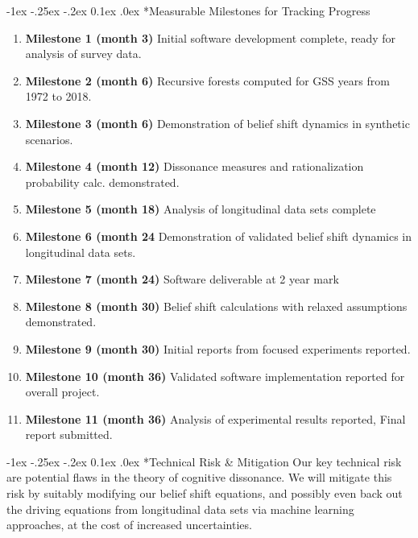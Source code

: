 \documentclass[onecolumn, compsoc,11pt]{IEEEtran}
\makeatletter
\renewcommand\subsection{\@startsection {section}{1}{\z@}%
                                   {-1ex \@plus -.25ex \@minus -.2ex}%
                                   {0.1ex \@plus.0ex}%
                                   {\fontsize{11}{10}\selectfont\bfseries\sffamily\color{DodgerBlue4}}}
\newcommand{\tball}[1][CadetBlue4]{${\color{#1}\Large\boldsymbol{\blacksquare}}$}
\makeatother
\begin{document}
\subsection*{Measurable Milestones for Tracking Progress}
\begin{enumerate}
[label=\tball, leftmargin=0pt,
labelindent=0em, topsep=0.1em, labelsep=*, itemsep=.15em,itemindent=2em]\color{black} \sffamily\fontsize{11}{12}\selectfont
\item  \textbf{Milestone 1 (month 3)} Initial software development complete, ready for analysis of survey data.
\item  \textbf{Milestone 2 (month 6)} Recursive forests computed for GSS years from 1972 to 2018.
\item \textbf{Milestone 3 (month 6) } Demonstration of belief shift dynamics in synthetic scenarios.
\item  \textbf{Milestone 4 (month 12)} Dissonance measures and rationalization probability calc. demonstrated.
\item \textbf{Milestone 5 (month 18) } Analysis of longitudinal data sets complete
  \item \textbf{Milestone 6 (month 24} Demonstration of validated belief shift dynamics in longitudinal data sets.
  \item \textbf{Milestone 7 (month 24)} Software deliverable at 2 year mark
  \item \textbf{Milestone 8 (month 30)} Belief shift calculations  with relaxed assumptions demonstrated.
  \item \textbf{Milestone 9 (month 30)} Initial reports from focused experiments reported.
  \item \textbf{Milestone 10 (month 36)} Validated software implementation reported for overall project.
 \item \textbf{Milestone 11 (month 36)} Analysis of experimental results reported, Final report submitted.
\end{enumerate}
%
\subsection*{Technical Risk \& Mitigation}
Our key technical risk are potential flaws in the theory of cognitive dissonance. We will mitigate this risk by suitably modifying our belief shift equations, and possibly even back out the driving equations from longitudinal data sets via machine learning approaches, at the cost of increased uncertainties.
\end{document}
